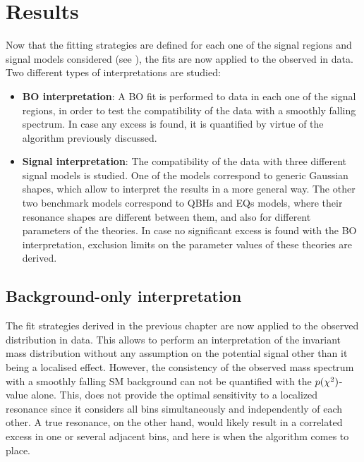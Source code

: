 \section{Results}
\label{sec:results:results}

Now that the fitting strategies are defined for each one of the signal regions and signal models considered (see \Tab{\ref{tab:bkg:modeling:strategy_modeling:summary}}), the fits are now applied to the observed \myj in data. Two different types of interpretations are studied:
\begin{itemize}
    \item \textbf{\acf{BO} interpretation}: A \ac{BO} fit is performed to data in each one of the signal regions, in order to test the compatibility of the data with a smoothly falling spectrum. In case any excess is found, it is quantified by virtue of the \bh algorithm previously discussed.
    \item \textbf{Signal interpretation}: The compatibility of the data with three different signal models is studied. One of the models correspond to generic Gaussian shapes, which allow to interpret the results in a more general way. The other two benchmark models correspond to \acp{QBH} and \acp{EQ} models, where their resonance shapes are different between them, and also for different parameters of the theories. In case no significant excess is found with the \ac{BO} interpretation, exclusion limits on the parameter values of these theories are derived.
\end{itemize}




\subsection{Background-only interpretation}
\label{subsec:results:results:bkgonly}

The fit strategies derived in the previous chapter are now applied to the observed \myj distribution in data. This allows to perform an interpretation of the invariant mass distribution without any assumption on the potential signal other than it being a localised effect. However, the consistency of the observed \gammajet mass spectrum with a smoothly falling \ac{SM} background can not be quantified with the \(p(\chi^{2})\)-value alone. This, does not provide the optimal sensitivity to a localized resonance since it considers all \myj bins simultaneously and independently of each other. A true resonance, on the other hand, would likely result in a correlated excess in one or several adjacent \myj bins, and here is when the \bh algorithm comes to place.

